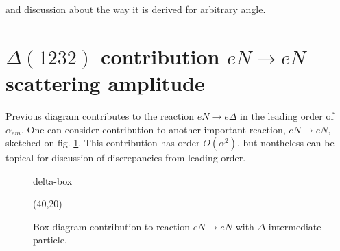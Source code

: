 \documentclass[12pt]{revtex4-1}
\begin{document}
	and discussion about the way it is derived for arbitrary angle.

\section{$\Delta(1232)$ contribution $e N \to e N$ scattering amplitude}
	Previous diagram contributes to the reaction $eN\to e\Delta$ in the leading
	order of $\alpha_{em}$. One can consider contribution to another important
	reaction, $eN \to eN$, sketched on fig. \ref{fig:delta-box}. This contribution
	has order $O(\alpha^2)$, but nontheless can be topical for discussion of 
	discrepancies from leading order.
	
	\begin{figure} \centering
	\label{fig:delta-box}
	\begin{fmffile}{delta-box}
		\begin{fmfgraph*}(40,20)
		\end{fmfgraph*}
	\end{fmffile}
	\caption{Box-diagram contribution to reaction $eN \to eN$ with %
		$\Delta$ intermediate particle.}
	\end{figure}
	
\end{document}

